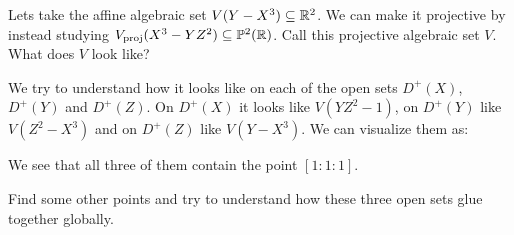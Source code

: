\begin{problem}
Lets take the affine algebraic set $V(Y-X^3)\subseteq \mathbb{R}^2$. We can make it projective by instead studying $V_{\text{proj}}(X^3-YZ^2)\subseteq \mathbb{P}^2(\mathbb{R})$. Call this projective algebraic set $V$. What does $V$ look like?

\begin{solution}
We try to understand how it looks like on each of the open sets $D^+(X)$, $D^+(Y)$ and $D^+(Z)$. On $D^+(X)$ it looks like $V(YZ^2-1)$, on $D^+(Y)$ like $V(Z^2-X^3)$ and on $D^+(Z)$ like $V(Y-X^3)$. 
We can visualize them as:

We see that all three of them contain the point $[1:1:1]$. 
\end{solution}
\end{problem}

\begin{problem}
Find some other points and try to understand how these three open sets glue together globally. 
\end{problem}

